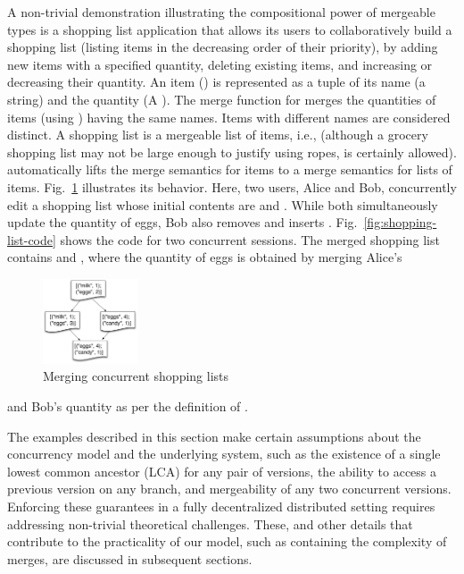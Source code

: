 A non-trivial demonstration illustrating the compositional power of
mergeable types is a shopping list application that allows its users
to collaboratively build a shopping list (listing items in the
decreasing order of their priority), by adding new items with a
specified quantity, deleting existing items, and increasing or
decreasing their quantity. An item () is represented as a
tuple of its name (a string) and the quantity (A ).  The
merge function for  merges the quantities of items (using
) having the same names. Items with different names are
considered distinct. A shopping list is a mergeable list of items,
i.e.,  (although a grocery shopping list may not be
large enough to justify using ropes,  is
certainly allowed).   automatically lifts the
merge semantics for items to a merge semantics for lists of items.
Fig.~\ref{fig:shopping-list} illustrates its behavior.  Here, two
users, Alice and Bob, concurrently edit a shopping list whose initial
contents are  and . While both simultaneously update
the quantity of eggs, Bob also removes  and inserts .
Fig.~\ref{fig:shopping-list-code} shows the \name code for two
concurrent sessions. The merged shopping list contains  and
, where the quantity of eggs is obtained by merging Alice's
\begin{figure}
  \centering
  \includegraphics[width=0.25\textwidth]{Figures/shopping-list}
  \caption{Merging concurrent shopping lists}
  \label{fig:shopping-list}
  \vspace*{.25in}
\end{figure}
and Bob's quantity as per the definition of .

The examples described in this section make certain assumptions about
the concurrency model and the underlying system, such as the existence
of a single lowest common ancestor (LCA) for any pair of versions, the
ability to access a previous version on any branch, and mergeability
of any two concurrent versions. Enforcing these guarantees in a fully
decentralized distributed setting requires addressing non-trivial
theoretical challenges. These, and other details that contribute to
the practicality of our model, such as containing the complexity of
merges, are discussed in subsequent sections.

